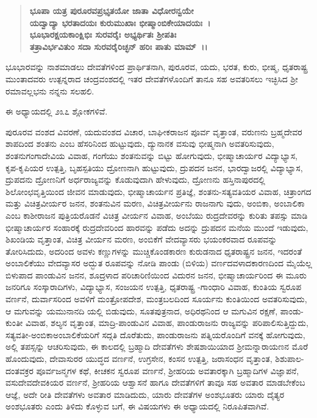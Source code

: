 \begin{verse}
\textbf{ಭೂಪಾ ಯತ್ರ ಪುರೂರವಪ್ರಭೃತಯೋ ಜಾತಾ ವಿಧೋರನ್ವಯೇ}\\\textbf{ಯದ್ವಾದ್ಯಾ ಭರತಾದಯಃ ಕುರುಮುಖಾಃ ಭೀಷ್ಮಾಂಬಿಕೇಯಾದಯಃ~।} \\\textbf{ಭೂಭಾರಕ್ಷಯಕಾಂಕ್ಷಿಭಿಃ ಸುರವರೈಃ ಅಭ್ಯರ್ಥಿತಃ ಶ‍್ರೀಪತಿಃ}\\\textbf{ ತತ್ರಾವಿರ್ಭವಿತುಂ ಸದಾ ಸುರವರೈರಿಚ್ಛನ್ ಹರಿಃ ಪಾತು ಮಾಮ್~।।}
\end{verse}

ಭೂಭಾರವನ್ನು ನಾಶಮಾಡಲು ದೇವತೆಗಳಿಂದ ಪ್ರಾರ್ಥಿತನಾಗಿ, ಪುರೂರವ, ಯದು, ಭರತ, ಕುರು, ಭೀಷ್ಮ, ಧೃತರಾಷ್ಟ್ರ ಮುಂತಾದವರು ಉತ್ಪನ್ನರಾದ ಚಂದ್ರವಂಶದಲ್ಲಿ ಇತರ ದೇವತೆಗಳೊಂದಿಗೆ ತಾನೂ ಸಹ ಅವತರಿಸಲು ಇಚ್ಛಿಸಿದ ಶ‍್ರೀ ರಮಾವಲ್ಲಭನು ನನ್ನನು ಸಲಹಲಿ.

ಈ ಅಧ್ಯಾಯದಲ್ಲಿ ೨೩೭ ಶ್ಲೋಕಗಳಿವೆ.

ಪುರೂರವ ವಂಶದ ವಿವರಣೆ, ಯದುವಂಶದ ವಿಚಾರ, ಬಾಘೀಕರಾಜನ ಪೂರ್ವ ವೃತ್ತಾಂತ, ವರುಣನು ಬ್ರಹ್ಮದೇವರ ಶಾಪದಿಂದ ಶಂತನು ಎಂಬ ಹೆಸರಿನಿಂದ ಹುಟ್ಟುವುದು, ದ್ಯುನಾನಕ ವಸುವು ಭೀಷ್ಮನಾಗಿ ಅವತರಿಸುವುದು, ಶಂತನುಗಂಗಾದೇವಿಯ ವಿವಾಹ, ಗಂಗೆಯು ಶಂತನುವನ್ನು ಬಿಟ್ಟು ಹೋಗುವುದು, ಭೀಷ್ಮಾಚಾರ್ಯರ ವಿದ್ಯಾಭ್ಯಾಸ, ಕೃಪ-\-ಕೃಪಿಯರ ಉತ್ಪತ್ತಿ, ಬೃಹಸ್ಪತಿಯು ದ್ರೋಣನಾಗಿ ಹುಟ್ಟುವುದು, ದ್ರುಪದನ ಜನನ, ಭಾರದ್ವಾಜರಲ್ಲಿ ವಿದ್ಯಾಭ್ಯಾಸ, ದ್ರುಪದನು ದ್ರೋಣನಿಗೆ ಅರ್ಧರಾಜ್ಯವನ್ನು ಕೊಡುವುದಾಗಿ ಹೇಳುವುದು, ದ್ರೋಣನು ಹಸ್ತಿನಾಪುರದಲ್ಲಿ ಶಿಲೋಂಛವೃತ್ತಿಯಿಂದ ಜೀವನ ಮಾಡುವುದು, ಭೀಷ್ಮಾಚಾರ್ಯನ ಪ್ರತಿಜ್ಞೆ, ಶಂತನು-ಸತ್ಯವತಿಯರ ವಿವಾಹ, ಚಿತ್ರಾಂಗದ ಮತ್ತು ವಿಚಿತ್ರವೀರ್ಯರ ಜನನ, ಶಂತನುವಿನ ಮರಣ, ವಿಚಿತ್ರವೀರ್ಯನು ರಾಜನಾಗು ವುದು, ಅಂಬಿಕಾ, ಅಂಬಾಲಿಕಾ ಎಂಬ ಕಾಶೀರಾಜನ ಪುತ್ರಿಯರೊಡನೆ ವಿಚಿತ್ರ ವೀರ್ಯನ ವಿವಾಹ, ಅಂಬೆಯು ರುದ್ರದೇವರನ್ನು ಕುರಿತು ತಪಸ್ಸು ಮಾಡಿ ಭೀಷ್ಮಾಚಾರ್ಯರ ಸಂಹಾರಕ್ಕೆ ರುದ್ರದೇವರಿಂದ ಹಾರವನ್ನು ಪಡೆದು ಅದನ್ನು ದ್ರುಪದನ ಮನೆಯ ಮುಂದೆ ಇಡುವುದು, ಶಿಖಂಡಿಯ ವೃತ್ತಾಂತ, ವಿಚಿತ್ರ ವೀರ್ಯನ ಮರಣ, ಅಂಬಿಕೆಗೆ ವೇದವ್ಯಾಸರು ಭಯಂಕರವಾದ ರೂಪವನ್ನು ತೋರಿಸಿದುದು, ಅದರಿಂದ ಅವಳು ಕಣ್ಣುಗಳನ್ನು ಮುಚ್ಚಿಕೊಂಡಕಾರಣ ಕುರುಡನಾದ ಧೃತರಾಷ್ಟ್ರನ ಜನನ, ಇದರಂತೆ ಅಂಬಾಲಿಕೆಯು ವೇದವ್ಯಾಸರ ಅದ್ಭುತ ರೂಪವನ್ನು ನೋಡಿ ಪಾಂಡು (ಬಿಳಿಯ) ವರ್ಣದವಳಾದಕಾರಣದಿಂದ ಮೈಯೆಲ್ಲ ಬಿಳುಪಾದ ಪಾಂಡುವಿನ ಜನನ, ಶೂದ್ರಳಾದ ಪರಿಚಾರಿಣಿಯಿಂದ ವಿದುರನ ಜನನ, ಭೀಷ್ಮಾಚಾರ್ಯರಿಂದ ಈ ಮೂರು ಜನರಿಗೂ ಸಂಸ್ಕಾರಾದಿಗಳು, ವಿದ್ಯಾಭ್ಯಾಸ, ಸಂಜಯನ ಉತ್ಪತ್ತಿ, ಧೃತರಾಷ್ಟ್ರ -\-ಗಾಂಧಾರಿ ವಿವಾಹ, ಕುಂತಿಯ ಸ್ವರೂಪ ವರ್ಣನೆ, ದುರ್ವಾಸರಿಂದ ಅವಳಿಗೆ ಮಂತ್ರೋಪದೇಶ, ಮಂತ್ರಬಲದಿಂದ ಸೂರ್ಯನು ಕುಂತಿಯಿಂದ ಅವತರಿಸುವುದು, ಆ ಮಗುವನ್ನು ಯಮುನಾನದಿ ಯಲ್ಲಿ ಬಿಡುವುದು, ಸೂತಪುತ್ರನಾದ, ಅಧಿರಥನಿಂದ ಆ ಮಗುವಿನ ರಕ್ಷಣೆ, ಪಾಂಡು-ಕುಂತೀ ವಿವಾಹ, ಶಲ್ಯನ ವೃತ್ತಾಂತ, ಮಾದ್ರಿ-ಪಾಂಡುವಿನ ವಿವಾಹ, ಪಾಂಡುರಾಜನು ರಾಜ್ಯವನ್ನು ಪರಿಪಾಲಿಸುತ್ತಿದ್ದುದು, ಸತ್ಯವತೀ-ಅಂಬಿಕಾ\-ಅಂಬಾಲಿಕೆಯರಿಗೆ ಸದ್ಗತಿ ದೊರೆತುದು, ಪಾಂಡುರಾಜನು ಪತ್ನಿಯರೊಂದಿಗೆ ವನಕ್ಕೆ ಹೋಗುವುದು, ಅಲ್ಲಿ ತಪಸ್ಸನ್ನು ಆಚರಿಸುವುದು, ಈ ಕಾಲದಲ್ಲಿ ಬ್ರಹ್ಮಾದಿ ದೇವತೆಗಳು ಶೇಷಶಾಯಿಯಾದ ಶ‍್ರೀಮನ್ನಾರಾಯಣನ ಮೊರೆ ಹೊಂದುವುದು, ದೇವಾಸುರರ ಯುದ್ಧದ ವರ್ಣನೆ, ಉಗ್ರಸೇನ, ಕಂಸನ ಉತ್ಪತ್ತಿ, ಜರಾಸಂಧನ ವೃತ್ತಾಂತ, ಶಿಶುಪಾಲ-ದಂತವಕ್ರರ ಪೂರ್ವಜನ್ಮಗಳ ಕಥೆ, ಕೀಚಕನ ಸ್ವರೂಪ ವರ್ಣನೆ, ಶ‍್ರೀಹರಿಯ ಅವತಾರಕ್ಕಾಗಿ ಬ್ರಹ್ಮಾದಿಗಳ ವಿಜ್ಞಾಪನೆ, ವಸುದೇವದೇವಕಿಯರ ವರ್ಣನೆ, ಶ‍್ರೀಹರಿಯ ಆಶ್ವಾಸನೆ ಹಾಗೂ ದೇವತೆಗಳಿಗೆ ತಾವೂ ಸಹ ಅವತಾರ ಮಾಡಬೇಕೆಂಬ ಆಜ್ಞೆ, ಅದೇ ರೀತಿ ದೇವತೆಗಳು ಅವತಾರ ಮಾಡಿದುದು, ಯಾರು ದೇವತೆಗಳ ಅಂಶಭೂತರು ಯಾರು ದೈತ್ಯರ ಅಂಶಭೂತರು ಎಂದು ತಿಳಿದು ಕೊಳ್ಳುವ ಬಗೆ, ಈ ವಿಷಯಗಳು ಈ ಅಧ್ಯಾಯದಲ್ಲಿ ನಿರೂಪಿತವಾಗಿವೆ.


